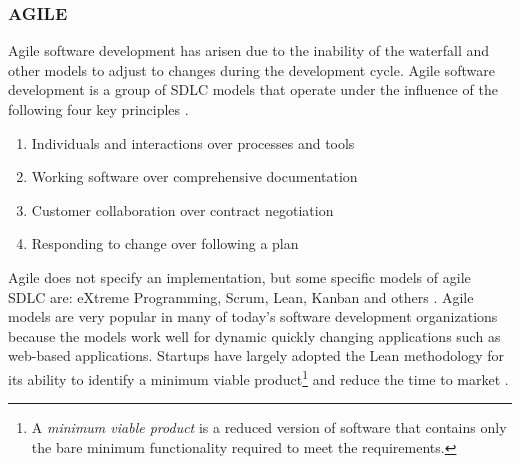 \documentclass[SDSUThesis.tex]{subfiles}
\begin{document}
        
    \subsubsection{AGILE}
        Agile software development has arisen due to the inability
        of the waterfall and other models to adjust to changes during the 
        development cycle.  
        Agile software development is a group of SDLC models that operate
        under the influence of the following four key principles \cite{Beck2001}.
        \begin{enumerate}
            \item Individuals and interactions over processes and tools
            \item Working software over comprehensive documentation
            \item Customer collaboration over contract negotiation
            \item Responding to change over following a plan
        \end{enumerate}
        Agile does not specify an implementation, but
        some specific models of agile SDLC are:
        eXtreme Programming, Scrum, Lean, Kanban and others 
        \cite{Moniruzzaman2013, Hibbs2009}.  Agile models 
        are very popular in many of today's software development
        organizations because the models work well for dynamic
        quickly changing applications such as web-based applications.
        Startups have largely adopted the Lean methodology for its
        ability to identify a minimum viable product\footnote{
        A \textit{minimum viable product} is a reduced version of software
        that contains only the bare minimum functionality required to meet
        the requirements.}
        and reduce the time to market \cite{Giardino2014}. 
        
        
\end{document}
